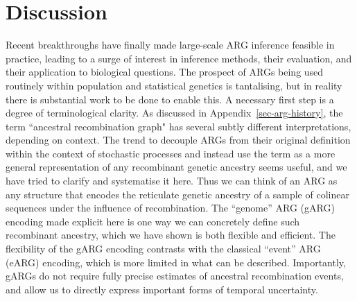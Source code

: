 \documentclass{article}
\begin{document}
\section{Discussion}
\label{sec-discussion}
Recent breakthroughs have finally made large-scale ARG inference
feasible in practice, leading to a surge of interest
in inference methods, their evaluation, and their application to biological questions.
The prospect of ARGs being used routinely within population
and statistical genetics is tantalising,
but in reality there is substantial work to be done to
enable this.
A necessary first step is a degree of terminological clarity.
As discussed in Appendix~\ref{sec-arg-history}, the term
``ancestral recombination graph" has several
subtly different interpretations, depending on context.
The trend to decouple ARGs from their original definition
within the context of stochastic
processes and instead use the term as a more general representation of any
recombinant genetic ancestry seems useful, and we have
tried to clarify and systematise it here. Thus
we can think of an ARG as any structure that encodes the
reticulate genetic ancestry of a sample of colinear sequences under
the influence of recombination. The ``genome'' ARG (gARG) encoding
made explicit here is one way we can concretely
define such recombinant ancestry, which we have shown is both
flexible and efficient.
The flexibility of the gARG encoding contrasts with the classical
``event'' ARG (eARG) encoding, which is more limited in what can be described.
Importantly, gARGs do not require fully precise estimates of
ancestral recombination events,
and allow us to directly express important forms of temporal uncertainty.
\end{document}
